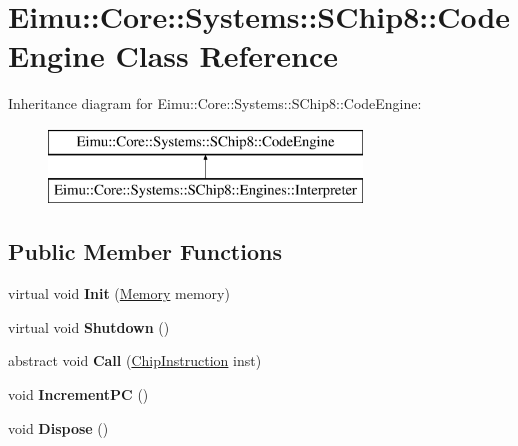 \hypertarget{class_eimu_1_1_core_1_1_systems_1_1_s_chip8_1_1_code_engine}{
\section{Eimu::Core::Systems::SChip8::CodeEngine Class Reference}
\label{class_eimu_1_1_core_1_1_systems_1_1_s_chip8_1_1_code_engine}
}
Inheritance diagram for Eimu::Core::Systems::SChip8::CodeEngine:\begin{figure}[H]
\begin{center}
\leavevmode
\includegraphics[height=2.000000cm]{class_eimu_1_1_core_1_1_systems_1_1_s_chip8_1_1_code_engine}
\end{center}
\end{figure}
\subsection*{Public Member Functions}
\begin{DoxyCompactItemize}
\item 
\hypertarget{class_eimu_1_1_core_1_1_systems_1_1_s_chip8_1_1_code_engine_a0fa6f3b3dbae608ce9548e3d6814d761}{
virtual void {\bfseries Init} (\hyperlink{class_eimu_1_1_core_1_1_memory}{Memory} memory)}
\label{class_eimu_1_1_core_1_1_systems_1_1_s_chip8_1_1_code_engine_a0fa6f3b3dbae608ce9548e3d6814d761}

\item 
\hypertarget{class_eimu_1_1_core_1_1_systems_1_1_s_chip8_1_1_code_engine_a0d86b4171ff88b5d110a4e451bab13ef}{
virtual void {\bfseries Shutdown} ()}
\label{class_eimu_1_1_core_1_1_systems_1_1_s_chip8_1_1_code_engine_a0d86b4171ff88b5d110a4e451bab13ef}

\item 
\hypertarget{class_eimu_1_1_core_1_1_systems_1_1_s_chip8_1_1_code_engine_a16359dedfc938e52f5b7b05a522278cd}{
abstract void {\bfseries Call} (\hyperlink{class_eimu_1_1_core_1_1_systems_1_1_s_chip8_1_1_chip_instruction}{ChipInstruction} inst)}
\label{class_eimu_1_1_core_1_1_systems_1_1_s_chip8_1_1_code_engine_a16359dedfc938e52f5b7b05a522278cd}

\item 
\hypertarget{class_eimu_1_1_core_1_1_systems_1_1_s_chip8_1_1_code_engine_abdc5e642701bc3db5581b0a73617064b}{
void {\bfseries IncrementPC} ()}
\label{class_eimu_1_1_core_1_1_systems_1_1_s_chip8_1_1_code_engine_abdc5e642701bc3db5581b0a73617064b}

\item 
\hypertarget{class_eimu_1_1_core_1_1_systems_1_1_s_chip8_1_1_code_engine_a246efbd7361660b7899dbf7a1ebbdd8e}{
void {\bfseries Dispose} ()}
\label{class_eimu_1_1_core_1_1_systems_1_1_s_chip8_1_1_code_engine_a246efbd7361660b7899dbf7a1ebbdd8e}

\end{DoxyCompactItemize}
